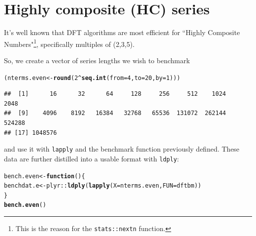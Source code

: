 \documentclass[12pt]{article}\usepackage{graphicx, color}
\makeatletter
\newcommand{\hlfunctioncall}[1]{\textcolor[rgb]{0.501960784313725,0,0.329411764705882}{\textbf{#1}}}%
\newenvironment{kframe}{%
 \def\at@end@of@kframe{}%
 \ifinner\ifhmode%
  \def\at@end@of@kframe{\end{minipage}}%
  \begin{minipage}{\columnwidth}%
 \fi\fi%
 \def\FrameCommand##1{\hskip\@totalleftmargin \hskip-\fboxsep
 \colorbox{shadecolor}{##1}\hskip-\fboxsep
     \hskip-\linewidth \hskip-\@totalleftmargin \hskip\columnwidth}%
 \MakeFramed {\advance\hsize-\width
   \@totalleftmargin\z@ \linewidth\hsize
   \@setminipage}}%
 {\par\unskip\endMakeFramed%
 \at@end@of@kframe}
\newenvironment{knitrout}{}{} %
\newcommand{\Rcmd}[1]{\texttt{#1}}
\makeatother
\begin{document}
\section{Highly composite (HC) series}
It's well known that DFT algorithms are most efficient
for ``Highly Composite Numbers"\footnote{
This is the reason for the \Rcmd{stats::nextn} function.
}, specifically multiples of (2,3,5).

So, we create a vector of series lengths we wish to benchmark
\begin{knitrout}
\color{fgcolor}\begin{kframe}
\begin{alltt}
(nterms.even <- \hlfunctioncall{round}(2^\hlfunctioncall{seq.int}(from = 4, to = 20, by = 1)))
\end{alltt}
\begin{verbatim}
##  [1]      16      32      64     128     256     512    1024    2048
##  [9]    4096    8192   16384   32768   65536  131072  262144  524288
## [17] 1048576
\end{verbatim}
\end{kframe}
\end{knitrout}

and use it with \Rcmd{lapply} and the benchmark function
previously defined.
These data are further distilled into a usable format
with \Rcmd{ldply}:
\begin{knitrout}
\color{fgcolor}\begin{kframe}
\begin{alltt}
bench.even <- \hlfunctioncall{function}() \{
    benchdat.e <- plyr::\hlfunctioncall{ldply}(\hlfunctioncall{lapply}(X = nterms.even, FUN = dftbm))
\}
\hlfunctioncall{bench.even}()
\end{alltt}
\end{kframe}
\end{knitrout}
\end{document}
